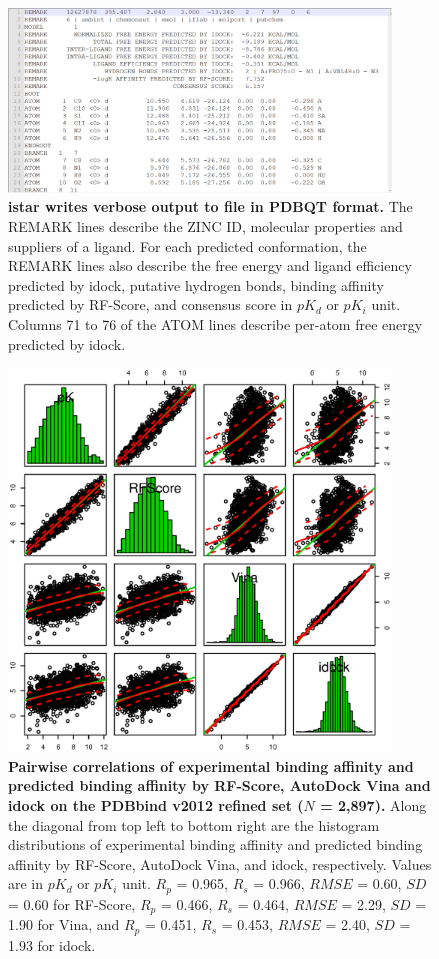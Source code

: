 \documentclass[10pt]{article}
\begin{document}
\begin{figure}[!ht]
\begin{center}
\includegraphics[width=4in]{OutputPDBQT.eps}
\end{center}
\caption{
{\bf istar writes verbose output to file in PDBQT format.} The REMARK lines describe the ZINC ID, molecular properties and suppliers of a ligand. For each predicted conformation, the REMARK lines also describe the free energy and ligand efficiency predicted by idock, putative hydrogen bonds, binding affinity predicted by RF-Score, and consensus score in $pK_d$ or $pK_i$ unit. Columns 71 to 76 of the ATOM lines describe per-atom free energy predicted by idock.
}
\label{OutputPDBQT}
\end{figure}

\begin{figure}[!ht]
\begin{center}
\includegraphics[width=4in]{PDBbind2012Correlations.eps}
\end{center}
\caption{
{\bf Pairwise correlations of experimental binding affinity and predicted binding affinity by RF-Score, AutoDock Vina and idock on the PDBbind v2012 refined set ($N$ = 2,897).} Along the diagonal from top left to bottom right are the histogram distributions of experimental binding affinity and predicted binding affinity by RF-Score, AutoDock Vina, and idock, respectively. Values are in $pK_d$ or $pK_i$ unit. $R_p$ = 0.965, $R_s$ = 0.966, $RMSE$ = 0.60, $SD$ = 0.60 for RF-Score, $R_p$ = 0.466, $R_s$ = 0.464, $RMSE$ = 2.29, $SD$ = 1.90 for Vina, and $R_p$ = 0.451, $R_s$ = 0.453, $RMSE$ = 2.40, $SD$ = 1.93 for idock.
}
\label{PDBbind2012Correlations}
\end{figure}
\end{document}
